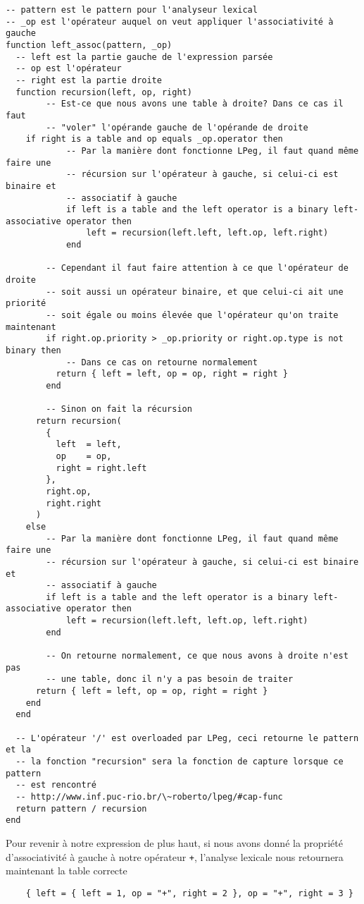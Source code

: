 \documentclass{article}
\begin{document}
\begin{verbatim}
-- pattern est le pattern pour l'analyseur lexical
-- _op est l'opérateur auquel on veut appliquer l'associativité à gauche
function left_assoc(pattern, _op)
  -- left est la partie gauche de l'expression parsée
  -- op est l'opérateur
  -- right est la partie droite
  function recursion(left, op, right)
		-- Est-ce que nous avons une table à droite? Dans ce cas il faut
		-- "voler" l'opérande gauche de l'opérande de droite
    if right is a table and op equals _op.operator then
			-- Par la manière dont fonctionne LPeg, il faut quand même faire une
			-- récursion sur l'opérateur à gauche, si celui-ci est binaire et
			-- associatif à gauche
			if left is a table and the left operator is a binary left-associative operator then
				left = recursion(left.left, left.op, left.right)
			end
	    
	    -- Cependant il faut faire attention à ce que l'opérateur de droite
	    -- soit aussi un opérateur binaire, et que celui-ci ait une priorité
	    -- soit égale ou moins élevée que l'opérateur qu'on traite maintenant
	    if right.op.priority > _op.priority or right.op.type is not binary then
		    -- Dans ce cas on retourne normalement
	      return { left = left, op = op, right = right }
	    end
    
	    -- Sinon on fait la récursion
      return recursion(
        {
          left  = left,
          op    = op,
          right = right.left
        },
        right.op,
        right.right
      )
    else
	    -- Par la manière dont fonctionne LPeg, il faut quand même faire une
	    -- récursion sur l'opérateur à gauche, si celui-ci est binaire et
	    -- associatif à gauche
	    if left is a table and the left operator is a binary left-associative operator then
		    left = recursion(left.left, left.op, left.right)
	    end
			
	    -- On retourne normalement, ce que nous avons à droite n'est pas
	    -- une table, donc il n'y a pas besoin de traiter
      return { left = left, op = op, right = right }
    end
  end
  
  -- L'opérateur '/' est overloaded par LPeg, ceci retourne le pattern et la 
  -- la fonction "recursion" sera la fonction de capture lorsque ce pattern
  -- est rencontré
  -- http://www.inf.puc-rio.br/\~roberto/lpeg/#cap-func
  return pattern / recursion
end
\end{verbatim}
Pour revenir à notre expression  \noindent de plus haut, si nous avons donné la propriété d'associativité à gauche à notre opérateur \lstinline|+|, l'analyse lexicale nous retournera maintenant la table correcte \begin{verbatim}
	{ left = { left = 1, op = "+", right = 2 }, op = "+", right = 3 }
\end{verbatim}
\end{document}
